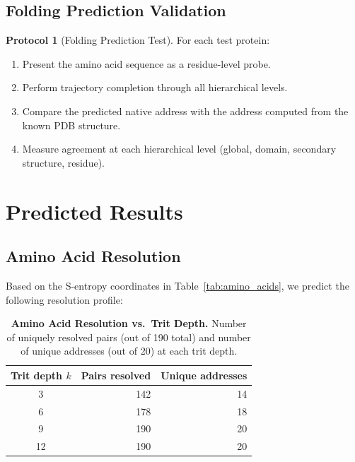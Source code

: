 \documentclass[11pt,twocolumn,a4paper]{article}
\theoremstyle{definition}
\newtheorem{protocol}[theorem]{Protocol}
\theoremstyle{remark}
\begin{document}
\subsection{Folding Prediction Validation}

\begin{protocol}[Folding Prediction Test]
\label{prot:fold_test}
For each test protein:
\begin{enumerate}[nosep]
\item Present the amino acid sequence as a residue-level probe.
\item Perform trajectory completion through all hierarchical levels.
\item Compare the predicted native address with the address computed from the known PDB structure.
\item Measure agreement at each hierarchical level (global, domain, secondary structure, residue).
\end{enumerate}
\end{protocol}

\section{Predicted Results}
\label{sec:predicted_results}

\subsection{Amino Acid Resolution}

Based on the S-entropy coordinates in Table~\ref{tab:amino_acids}, we predict the following resolution profile:

\begin{table}[H]
\centering
\caption{\textbf{Amino Acid Resolution vs.\ Trit Depth.} Number of uniquely resolved pairs (out of 190 total) and number of unique addresses (out of 20) at each trit depth.}
\label{tab:resolution}
\begin{tabular}{@{}crr@{}}
\toprule
Trit depth $k$ & Pairs resolved & Unique addresses \\
\midrule
3  & 142 & 14 \\
6  & 178 & 18 \\
9  & 190 & 20 \\
12 & 190 & 20 \\
\bottomrule
\end{tabular}
\end{table}
\end{document}
